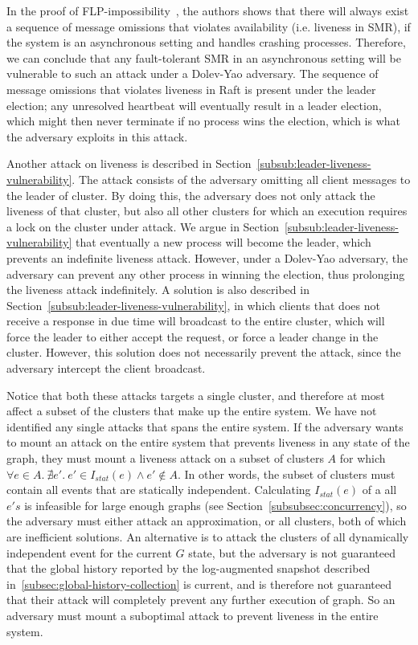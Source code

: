 \documentclass{article}
\begin{document}
		In the proof of FLP-impossibility~\cite{fischer_impossibility_1985}, the authors shows that there will always exist a sequence of message omissions that violates availability (i.e. liveness in SMR), if the system is an asynchronous setting and handles crashing processes.
		Therefore, we can conclude that any fault-tolerant SMR in an asynchronous setting will be vulnerable to such an attack under a Dolev-Yao adversary.
		The sequence of message omissions that violates liveness in Raft is present under the leader election; any unresolved heartbeat will eventually result in a leader election, which might then never terminate if no process wins the election, which is what the adversary exploits in this attack.

		Another attack on liveness is described in Section~\ref{subsub:leader-liveness-vulnerability}.
		The attack consists of the adversary omitting all client messages to the leader of cluster.
		By doing this, the adversary does not only attack the liveness of that cluster, but also all other clusters for which an execution requires a lock on the cluster under attack.
		We argue in Section~\ref{subsub:leader-liveness-vulnerability} that eventually a new process will become the leader, which prevents an indefinite liveness attack.
		However, under a Dolev-Yao adversary, the adversary can prevent any other process in winning the election, thus prolonging the liveness attack indefinitely.
		A solution is also described in Section~\ref{subsub:leader-liveness-vulnerability}, in which clients that does not receive a response in due time will broadcast to the entire cluster, which will force the leader to either accept the request, or force a leader change in the cluster.
		However, this solution does not necessarily prevent the attack, since the adversary intercept the client broadcast.

		Notice that both these attacks targets a single cluster, and therefore at most affect a subset of the clusters that make up the entire system.
		We have not identified any single attacks that spans the entire system.
		If the adversary wants to mount an attack on the entire system that prevents liveness in any state of the graph, they must mount a liveness attack on a subset of clusters $A$ for which $\forall e \in A.\ \nexists e'.\ e' \in I_{stat}(e) \land e' \not \in A$.
		In other words, the subset of clusters must contain all events that are statically independent.
		Calculating $I_{stat}(e)$ of a all $e's$ is infeasible for large enough graphs (see Section~\ref{subsubsec:concurrency}), so the adversary must either attack an approximation, or all clusters, both of which are inefficient solutions.
		An alternative is to attack the clusters of all dynamically independent event for the current $G$ state, but the adversary is not guaranteed that the global history reported by the log-augmented snapshot described in~\ref{subsec:global-history-collection} is current, and is therefore not guaranteed that their attack will completely prevent any further execution of graph.
		So an adversary must mount a suboptimal attack to prevent liveness in the entire system.
\end{document}
